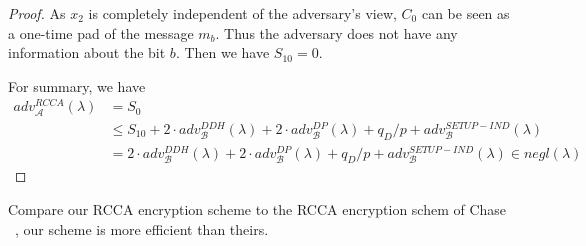 \begin{proof}
  As $x_2$ is completely independent of the adversary's view, $C_0$ can be seen as a one-time pad of the message $m_b$. Thus the adversary does not have any information about the bit $b$. Then we have $S_{10} = 0$.

  For summary, we have
  \begin{align*}
    adv_{\mathcal{A}}^{RCCA}(\lambda) &= S_0\\
    &\leq S_{10} + 2 \cdot adv_{\mathcal{B}}^{DDH}(\lambda) + 2 \cdot adv_{\mathcal{B}}^{DP}(\lambda) + q_D/p + adv_{\mathcal{B}}^{SETUP-IND}(\lambda)\\
    &= 2 \cdot adv_{\mathcal{B}}^{DDH}(\lambda) + 2 \cdot adv_{\mathcal{B}}^{DP}(\lambda) + q_D/p + adv_{\mathcal{B}}^{SETUP-IND}(\lambda) \in negl(\lambda)
  \end{align*}
\end{proof}


Compare our RCCA encryption scheme to the RCCA encryption schem of Chase \etal~\cite{DBLP:conf/eurocrypt/ChaseKLM12}, our scheme is more efficient than theirs.

